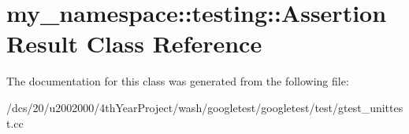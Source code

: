 \hypertarget{classmy__namespace_1_1testing_1_1AssertionResult}{}\section{my\+\_\+namespace\+:\+:testing\+:\+:Assertion\+Result Class Reference}
\label{classmy__namespace_1_1testing_1_1AssertionResult}


The documentation for this class was generated from the following file\+:\begin{DoxyCompactItemize}
\item 
/dcs/20/u2002000/4th\+Year\+Project/wash/googletest/googletest/test/gtest\+\_\+unittest.\+cc\end{DoxyCompactItemize}
